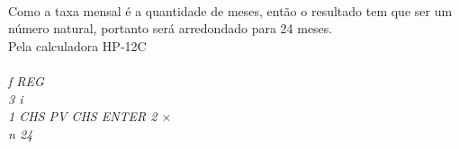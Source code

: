 \documentclass[a4paper, 12pt]{article}
\begin{document}
\begin{itemize}
\\

Como a taxa mensal é a quantidade de meses, então o resultado tem que ser um número natural, portanto será arredondado para 24 meses. \\

Pela calculadora HP-12C\\\\
\emph{f REG}\\
\emph{3 i}\\
\emph{1 CHS PV CHS ENTER 2 $ \times $ }\\
\emph{n 24}

\end{itemize}
\end{document}
